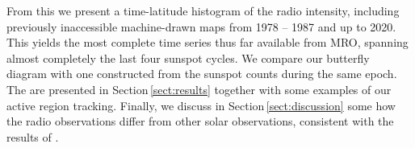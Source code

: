 \documentclass{aa}
\begin{document}
   
  From this we present a time-latitude histogram of the radio intensity,
  including previously inaccessible machine-drawn maps from 1978 -- 1987 and
  up to 2020.
  This yields the most complete time series thus far available from MRO, 
  spanning almost completely the last four sunspot cycles.
  We compare our butterfly diagram with one constructed from the sunspot 
  counts during the same epoch.
  The are presented in Section\,\ref{sect:results} together with some 
  examples of our active region tracking.
  Finally, we discuss in Section\,\ref{sect:discussion} some how the radio 
  observations differ from other solar observations, consistent with the 
  results of \citet{Shibasaki13}. 

\end{document}
